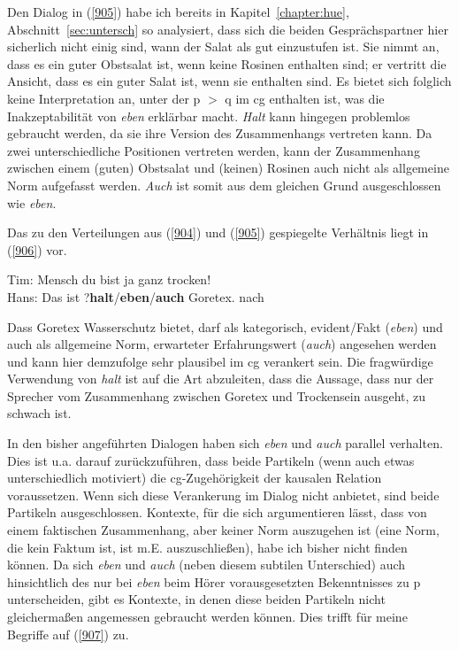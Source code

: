 {Den Dialog in (\ref{905}) habe ich bereits in Kapitel~\ref{chapter:hue}, Abschnitt~\ref{sec:untersch} so analysiert, dass sich die beiden Gesprächspartner hier sicherlich nicht einig sind, wann der Salat als gut einzustufen ist. Sie nimmt an, dass es ein guter Obstsalat ist, wenn keine Rosinen enthalten sind; er vertritt die Ansicht, dass es ein guter Salat ist, wenn sie enthalten sind. Es bietet sich folglich keine Interpretation an, unter der p $>$ q im cg enthalten ist, was die Inakzeptabilität von \textit{eben} erklärbar macht. \textit{Halt} kann hingegen problemlos gebraucht werden, da sie ihre Version des Zusammenhangs vertreten kann. Da zwei unterschiedliche Positionen vertreten werden, kann der Zusammenhang zwischen einem (guten) Obstsalat und (keinen) Rosinen auch nicht als allgemeine Norm aufgefasst werden. \textit{Auch} ist somit aus dem gleichen Grund ausgeschlossen wie \textit{eben}.

Das zu den Verteilungen aus (\ref{904}) und (\ref{905}) gespiegelte Verhältnis liegt in (\ref{906}) vor.

\begin{exe}
	\ex\label{906}
	Tim: Mensch du bist ja ganz trocken!\\
	Hans: Das ist ?\textbf{halt}/\textbf{eben}/\textbf{auch} Goretex.	
	\hfill\hbox {nach \citet[125]{Thurmair1989}}
\end{exe}
Dass Goretex Wasserschutz bietet, darf als kategorisch, evident/Fakt (\textit{eben}) und auch als allgemeine Norm, erwarteter Erfahrungswert (\textit{auch}) angesehen werden und kann hier demzufolge sehr plausibel im cg verankert sein. Die fragwürdige Verwendung von \textit{halt} ist auf die Art abzuleiten, dass die Aussage, dass nur der Sprecher vom Zusammenhang zwischen Goretex und Trockensein ausgeht, zu schwach ist.

In den bisher angeführten Dialogen haben sich \textit{eben} und \textit{auch} parallel verhalten. Dies ist u.a. darauf zurückzuführen, dass beide Partikeln (wenn auch etwas unterschiedlich motiviert) die cg-Zugehörigkeit der kausalen Relation voraussetzen. Wenn sich diese Verankerung im Dialog nicht anbietet, sind beide Partikeln ausgeschlossen. Kontexte, für die sich argumentieren lässt, dass von einem faktischen Zusammenhang, aber keiner Norm auszugehen ist (eine Norm, die kein Faktum ist, ist m.E. auszuschließen), habe ich bisher nicht finden können. Da sich \textit{eben} und \textit{auch} (neben diesem subtilen Unterschied) auch hinsichtlich des nur bei \textit{eben} beim Hörer vorausgesetzten Bekenntnisses zu p unterscheiden, gibt es Kontexte, in denen diese beiden Partikeln nicht gleichermaßen angemessen gebraucht werden können. Dies trifft für meine Begriffe auf (\ref{907}) zu.

}
